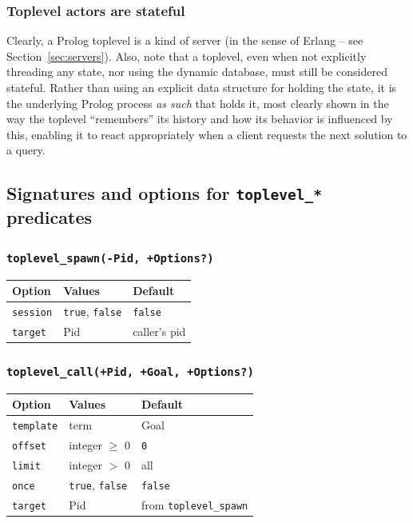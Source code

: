 \subsubsection*{Toplevel actors are stateful}\label{sec:toplevel-stateful}

Clearly, a Prolog toplevel is a kind of server (in the sense of Erlang -- see Section~\ref{sec:servers}). Also, note that a toplevel, even when not explicitly threading any state, nor using the dynamic database, must still be considered stateful. Rather than using an explicit data structure for holding the state, it is the underlying Prolog process \textit{as such} that holds it, most clearly shown in the way the toplevel ``remembers'' its history and how its behavior is influenced by this, enabling it to react appropriately when a client requests the next solution to a query.


\subsection{Signatures and options for \texttt{toplevel\_*} predicates}

\subsubsection*{\texttt{toplevel\_spawn(-Pid, +Options?)}}


\begin{tabularx}{11cm}{|X|X|X|}
\hline
\textbf{Option} & \textbf{Values} & \textbf{Default} \\
\hline
\texttt{session} & \texttt{true}, \texttt{false} & \texttt{false} \\
\texttt{target} & Pid & caller's pid \\
\hline
\end{tabularx}

\subsubsection*{\texttt{toplevel\_call(+Pid, +Goal, +Options?)}}

\begin{tabularx}{11cm}{|X|X|X|}
\hline
\textbf{Option} & \textbf{Values} & \textbf{Default} \\
\hline
\texttt{template} & term & Goal \\
\texttt{offset} & integer $\geq$ 0 & \texttt{0} \\
\texttt{limit} & integer $>$ 0 & all \\
\texttt{once} & \texttt{true}, \texttt{false} & \texttt{false} \\
\texttt{target} & Pid & from \texttt{toplevel\_spawn} \\
\hline
\end{tabularx}

